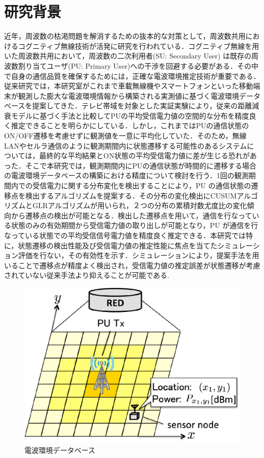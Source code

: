 \documentclass[technicalreport]{ieicej}
\begin{document}
\section{研究背景}
近年，周波数の枯渇問題を解消するための抜本的な対策として，周波数共用におけるコグニティブ無線技術が活発に研究を行われている．コグニティブ無線を用いた周波数共用において，周波数の二次利用者(SU: Secondary User) は既存の周波数割り当てユーザ(PU: Primary User)への干渉を回避する必要がある．その中で自身の通信品質を確保するためには，正確な電波環境推定技術が重要である．従来研究では，本研究室がこれまで車載無線機やスマートフォンといった移動端末が観測した膨大な電波環境情報から構築される実測値に基づく電波環境データベースを提案してきた．テレビ帯域を対象とした実証実験により，従来の距離減衰モデルに基づく手法と比較してPUの平均受信電力値の空間的な分布を精度良く推定できることを明らかにしている．しかし，これまではPUの通信状態のON/OFF遷移を考慮せずに観測値を一意に平均化していた．そのため，無線LANやセルラ通信のように観測期間内に状態遷移する可能性のあるシステムについては，最終的な平均結果とON状態の平均受信電力値に差が生じる恐れがあった．そこで本研究では，観測期間内にPUの通信状態が時間的に遷移する場合の電波環境データベースの構築における精度について検討を行う．1回の観測期間内での受信電力に関する分布変化を検出することにより，PU の通信状態の遷移点を検出するアルゴリズムを提案する．その分布の変化検出にCUSUMアルゴリズムとGLRアルゴリズムが用いられ，２つの分布の累積対数尤度比の変化傾向から遷移点の検出が可能となる．検出した遷移点を用いて，通信を行なっている状態のみの有効期間から受信電力値の取り出しが可能となり，PU が通信を行なっている状態での平均受信信号電力値を精度良く推定できる．本研究では特に，状態遷移の検出性能及び受信電力値の推定性能に焦点を当てたシミュレーション評価を行ない，その有効性を示す．シミュレーションにより，提案手法を用いることで遷移点が精度よく検出され，受信電力値の推定誤差が状態遷移が考慮されていない従来手法より抑えることが可能である.
\begin{figure}[t]
  \centering
  \includegraphics[width=0.8\hsize,clip]{database.eps}
  \caption{電波環境データベース}
  \label{databse}
\end{figure}
\end{document}
